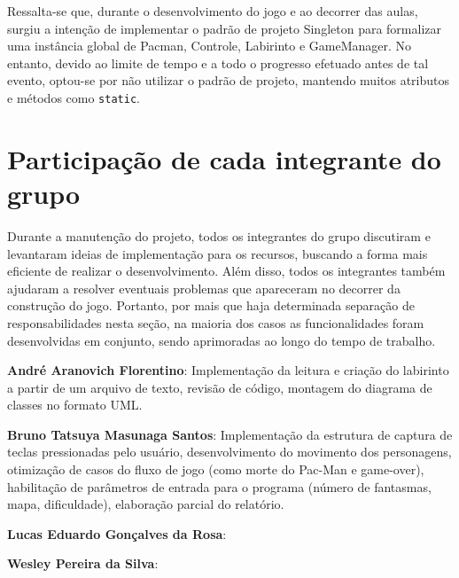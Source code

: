 \documentclass[]{article}
\begin{document}
Ressalta-se que, durante o desenvolvimento do jogo e ao decorrer das aulas, surgiu a intenção de implementar o padrão de projeto Singleton para formalizar uma instância global de Pacman, Controle, Labirinto e GameManager. No entanto, devido ao limite de tempo e a todo o progresso efetuado antes de tal evento, optou-se por não utilizar o padrão de projeto, mantendo muitos atributos e métodos como \texttt{static}.

\section{Participação de cada integrante do grupo}
Durante a manutenção do projeto, todos os integrantes do grupo discutiram e levantaram ideias de implementação para os recursos, buscando a forma mais eficiente de realizar o desenvolvimento. Além disso, todos os integrantes também ajudaram a resolver eventuais problemas que apareceram no decorrer da construção do jogo. Portanto, por mais que haja determinada separação de responsabilidades nesta seção, na maioria dos casos as funcionalidades foram desenvolvidas em conjunto, sendo aprimoradas ao longo do tempo de trabalho.

\textbf{André Aranovich Florentino}: Implementação da leitura e criação do labirinto a partir de um arquivo de texto, revisão de código, montagem do diagrama de classes no formato UML.

\textbf{Bruno Tatsuya Masunaga Santos}: Implementação da estrutura de captura de teclas pressionadas pelo usuário, desenvolvimento do movimento dos personagens, otimização de casos do fluxo de jogo (como morte do Pac-Man e game-over), habilitação de parâmetros de entrada para o programa (número de fantasmas, mapa, dificuldade), elaboração parcial do relatório.

\textbf{Lucas Eduardo Gonçalves da Rosa}:

\textbf{Wesley Pereira da Silva}:
\end{document}
